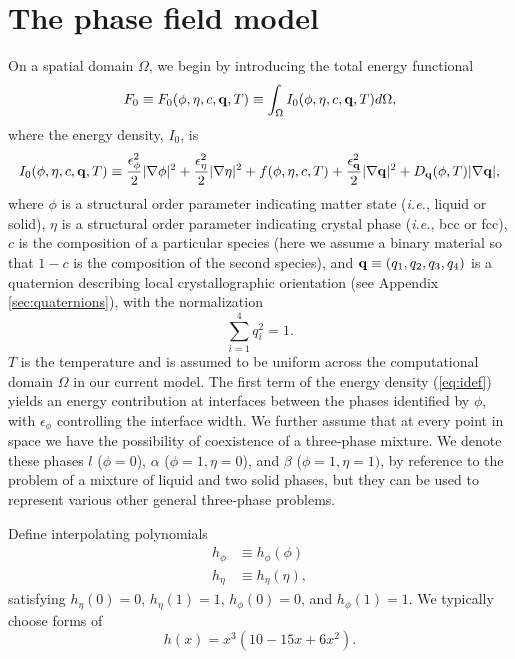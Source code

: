 \chapter{The phase field model}
\label{sec:model}

On a spatial domain $\Omega$, we begin by introducing the total energy
functional
%
\begin{equation}
  F_0 \equiv F_0(\phi,\eta,c,{\bf q},T)
    \equiv \int_{\Omega} I_0(\phi,\eta,c,{\bf q},T) d\Omega,
\label{eq:fdef}
\end{equation}
%
where the energy density, $I_0$, is
%
\begin{equation}
  I_0(\phi,\eta,c,{\bf q},T) \equiv
    \frac{\epsilon_{\phi}^2}{2} |\nabla \phi |^2 +
    \frac{\epsilon_{\eta}^2}{2} |\nabla \eta |^2 +
    f(\phi,\eta,c,T) +
    \frac{\epsilon_{\bf q}^2}{2} |\nabla {\bf q} |^2 +
    D_{\bf q}(\phi,T) |\nabla {\bf q} |,
\label{eq:idef}
\end{equation}
%
where $\phi$ is a structural order parameter indicating matter state
({\em i.e.}, liquid or solid), $\eta$ is a structural order parameter
indicating crystal phase ({\em i.e.}, bcc or fcc), $c$ is the
composition of a particular species (here we assume a binary material
so that $1-c$ is the composition of the second species), and ${\bf q}
\equiv (q_1,q_2,q_3,q_4)$ is a quaternion describing local
crystallographic orientation (see Appendix \ref{sec:quaternions}),
with the normalization
%
\begin{equation}
  \sum_{i=1}^4 q_i^2 = 1.
\label{eq:constraint}
\end{equation}
%
$T$ is the temperature and is assumed to be uniform across the
computational domain $\Omega$ in our current model.  The first term of
the energy density (\ref{eq:idef}) yields an energy contribution at
interfaces between the phases identified by $\phi$, with
$\epsilon_{\phi}$ controlling the interface width.  We further assume
that at every point in space we have the possibility of coexistence of
a three-phase mixture.  We denote these phases $l$ ($\phi=0$),
$\alpha$ ($\phi=1,\eta=0$), and $\beta$ ($\phi=1,\eta=1)$, by
reference to the problem of a mixture of liquid and two solid phases,
but they can be used to represent various other general three-phase
problems.

Define interpolating polynomials
%
\begin{align}
  h_\phi & \equiv h_\phi(\phi) \\
  h_\eta & \equiv h_\eta(\eta),
\end{align}
%
satisfying $h_\eta(0)=0$, $h_\eta(1)=1$, $h_\phi(0)=0$, and
$h_\phi(1)=1$.  We typically choose forms of
%
\begin{equation}
  h(x) = x^3 \left( 10 - 15 x + 6 x^2 \right).
\end{equation}
%


